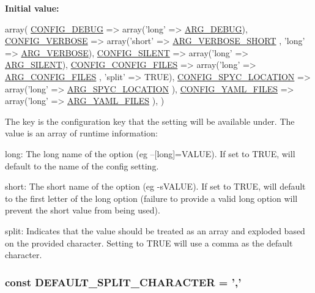 {\bfseries Initial value\-:}
\begin{DoxyCode}
 array(
  \hyperlink{group__config_ga45d0602aad6bc9cbe04270b059d48bcd}{CONFIG\_DEBUG} => array(\textcolor{stringliteral}{'long'} => \hyperlink{group__args_ga4c16b86b9d4656b8c7c6d27510566d77}{ARG\_DEBUG}),
  \hyperlink{group__config_gad09ed47ac67500b2ba6cc4a88d667a67}{CONFIG\_VERBOSE} => array(\textcolor{stringliteral}{'short'} => \hyperlink{group__args_gab83df86552c8e9e5c2382a8948111235}{ARG\_VERBOSE\_SHORT}
      , \textcolor{stringliteral}{'long'} => \hyperlink{group__args_gac79062d79c803c74aee0337d9637f574}{ARG\_VERBOSE}),
  \hyperlink{group__config_gae51e7d020c4c382825abd620db8f406b}{CONFIG\_SILENT} => array(\textcolor{stringliteral}{'long'} => \hyperlink{group__args_gafd7c5af186098f8c54f92f6a0f5ff23c}{ARG\_SILENT}),
  \hyperlink{group__config_gae9bcc12ef43805dccf313d96ba6949ac}{CONFIG\_CONFIG\_FILES} => array(\textcolor{stringliteral}{'long'} => \hyperlink{group__args_ga87849d19fd64c989a9562207edb3d6f5}{ARG\_CONFIG\_FILES}
      , \textcolor{stringliteral}{'split'} => TRUE),
  \hyperlink{group__config_ga1c9780167f4edef2e4a8688045caeedb}{CONFIG\_SPYC\_LOCATION} => array(\textcolor{stringliteral}{'long'} => \hyperlink{group__args_ga73d8fbeb725231563d894795457b1adf}{ARG\_SPYC\_LOCATION}
      ),
  \hyperlink{group__config_gac84613fd7b98146ba56ca2d0ebad83c5}{CONFIG\_YAML\_FILES} => array(\textcolor{stringliteral}{'long'} => \hyperlink{group__args_ga17328c6a748e7ced71ea6ed9b0107742}{ARG\_YAML\_FILES}
      ),
)
\end{DoxyCode}
The key is the configuration key that the setting will be available under. The value is an array of runtime information\-:
\begin{DoxyItemize}
\item long\-: The long name of the option (eg --\mbox{[}long\mbox{]}=V\-A\-L\-U\-E). If set to T\-R\-U\-E, will default to the name of the config setting.
\item short\-: The short name of the option (eg -\/s\-V\-A\-L\-U\-E). If set to T\-R\-U\-E, will default to the first letter of the long option (failure to provide a valid long option will prevent the short value from being used).
\item split\-: Indicates that the value should be treated as an array and exploded based on the provided character. Setting to T\-R\-U\-E will use a comma as the default character. 
\end{DoxyItemize}\hypertarget{common_8inc_a5fe77ccb49fee356e22cffa5a058e20d}{
\subsubsection[{D\-E\-F\-A\-U\-L\-T\-\_\-\-S\-P\-L\-I\-T\-\_\-\-C\-H\-A\-R\-A\-C\-T\-E\-R}]{\setlength{\rightskip}{0pt plus 5cm}const D\-E\-F\-A\-U\-L\-T\-\_\-\-S\-P\-L\-I\-T\-\_\-\-C\-H\-A\-R\-A\-C\-T\-E\-R = ','}}\label{common_8inc_a5fe77ccb49fee356e22cffa5a058e20d}
